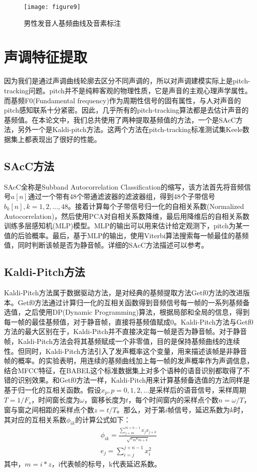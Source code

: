 \begin{figure}[htbp]
\centering
\texttt{[image: figure9]}
\caption{男性发音人基频曲线及音素标注}\label{fig:figure9}
\vspace{\baselineskip}
\end{figure}

\section{声调特征提取}
因为我们是通过声调曲线轮廓去区分不同声调的，所以对声调建模实际上是pitch-tracking问题。pitch并不是纯粹客观的物理性质，它是声音的主观心理声学属性。而基频F0(Fundamental frequency)作为周期性信号的固有属性，与人对声音的pitch感知联系十分紧密。因此，几乎所有的pitch-tracking算法都是去估计声音的基频值\cite{kleijn1995robust}。在本论文中，我们总共使用了两种提取基频值的方法，一个是SAcC方法\cite{lee2012noise}，另外一个是Kaldi-pitch方法\cite{ghahremani2014pitch}。这两个方法在pitch-tracking标准测试集Keele数据集\cite{plante1995pitch}上都表现出了很好的性能。
\subsection{SAcC方法}
SAcC全称是Subband Autocorrelation Classification的缩写，该方法首先将音频信号$a[n]$通过一个带有48个带通滤波器的滤波器组，得到48个子带信号$b_k[n],k=1,2,...,48$。接着计算每个子带信号归一化的自相关系数(Normalized Autocorrelation)，然后使用PCA对自相关系数降维，最后用降维后的自相关系数训练多层感知机(MLP)模型。MLP的输出可以用来估计给定观测下，pitch为某一值的后验概率。最后，基于MLP的输出，使用Viterbi算法搜索每一帧最佳的基频值，同时判断该帧是否为静音帧。详细的SAcC方法描述可以参考\cite{lee2012noise}。
\subsection{Kaldi-Pitch方法}
Kaldi-Pitch方法\cite{ghahremani2014pitch}属于数据驱动方法，是对经典的基频提取方法Getf0方法\cite{kleijn1995robust}的改进版本。Getf0方法通过计算归一化的互相关函数得到音频信号每一帧的一系列基频备选值，之后使用DP(Dynamic Programming)算法，根据局部和全局的信息，得到每一帧的最佳基频值，对于静音帧，直接将基频值赋成0。Kaldi-Pitch方法与Getf0方法的最大区别在于，Kaldi-Pitch并不直接决定每一帧是否为静音帧。对于静音帧，Kaldi-Pitch方法会将其基频赋成一个非零值，目的是保持基频曲线的连续性。但同时，Kaldi-Pitch方法引入了发声概率这个变量，用来描述该帧是非静音帧的概率。\cite{ghahremani2014pitch}的实验表明，用连续的基频曲线加上每一帧的发声概率作为声调信息，结合MFCC特征，在BABEL这个标准数据集上对多个语种的语音识别都取得了不错的识别效果。和Getf0方法一样，Kaldi-Pitch用来计算基频备选值的方法同样是基于归一化的互相关函数。假设$x_p,p=0,1,2,...$是采样后的语音信号，采样周期$T=1/F_s$，时间窗长度为$\omega$，窗移长度为$t$，每个时间窗内的采样点个数$n=\omega/T$，窗与窗之间相距的采样点个数$z=t/T$。那么，对于第$i$帧信号，延迟系数为$k$时，其对应的互相关系数$\phi_{ik}$的计算公式如下：
\begin{eqnarray}
  \phi_{ik}=\frac{\sum_{j=m}^{m+n-1} x_j x_{j+k}}{\sqrt{e_m e_{m+k}}} \\
  e_j=\sum_{i=j}^{j+n-1} x_i^2
\end{eqnarray}
其中，$m=i*z$，i代表帧的标号，k代表延迟系数。

